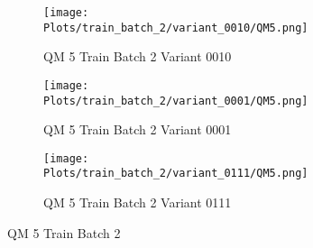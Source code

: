 \documentclass{DissertateFigs}
\begin{document}
\begin{figure}[t!]
\medskip

    \begin{subfigure}{0.47\textwidth}
    \texttt{[image: Plots/train\_batch\_2/variant\_0010/QM5.png]}
    \caption{QM 5 Train Batch 2 Variant 0010}
    \end{subfigure}
    \begin{subfigure}{0.47\textwidth}
    \texttt{[image: Plots/train\_batch\_2/variant\_0001/QM5.png]}
    \caption{QM 5 Train Batch 2 Variant 0001}
    \end{subfigure}

\medskip

    \begin{subfigure}{0.47\textwidth}
    \texttt{[image: Plots/train\_batch\_2/variant\_0111/QM5.png]}
    \caption{QM 5 Train Batch 2 Variant 0111}
    \end{subfigure}
\caption{QM 5 Train Batch 2}
    \end{figure}
\clearpage
\end{document}
